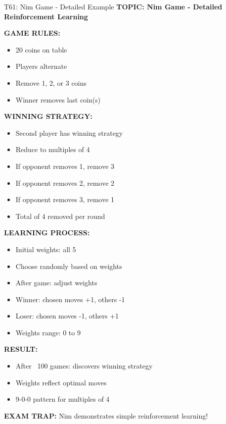 \documentclass[8pt]{beamer}
\begin{document}
	\begin{frame}{T61: Nim Game - Detailed Example}
		\fontsize{6.5}{7.5}\selectfont
		\textbf{TOPIC: Nim Game - Detailed Reinforcement Learning}
		
		\vspace{0.1cm}
		\textbf{GAME RULES:}
		\begin{itemize}
			\item 20 coins on table
			\item Players alternate
			\item Remove 1, 2, or 3 coins
			\item Winner removes last coin(s)
		\end{itemize}
		
		\vspace{0.1cm}
		\textbf{WINNING STRATEGY:}
		\begin{itemize}
			\item Second player has winning strategy
			\item Reduce to multiples of 4
			\item If opponent removes 1, remove 3
			\item If opponent removes 2, remove 2
			\item If opponent removes 3, remove 1
			\item Total of 4 removed per round
		\end{itemize}
		
		\vspace{0.1cm}
		\textbf{LEARNING PROCESS:}
		\begin{itemize}
			\item Initial weights: all 5
			\item Choose randomly based on weights
			\item After game: adjust weights
			\item Winner: chosen moves +1, others -1
			\item Loser: chosen moves -1, others +1
			\item Weights range: 0 to 9
		\end{itemize}
		
		\vspace{0.1cm}
		\textbf{RESULT:}
		\begin{itemize}
			\item After ~100 games: discovers winning strategy
			\item Weights reflect optimal moves
			\item 9-0-0 pattern for multiples of 4
		\end{itemize}
		
		\textcolor{myred}{\textbf{EXAM TRAP:}} Nim demonstrates \textcolor{myblue}{simple reinforcement learning}!
	\end{frame}
	
\end{document}
